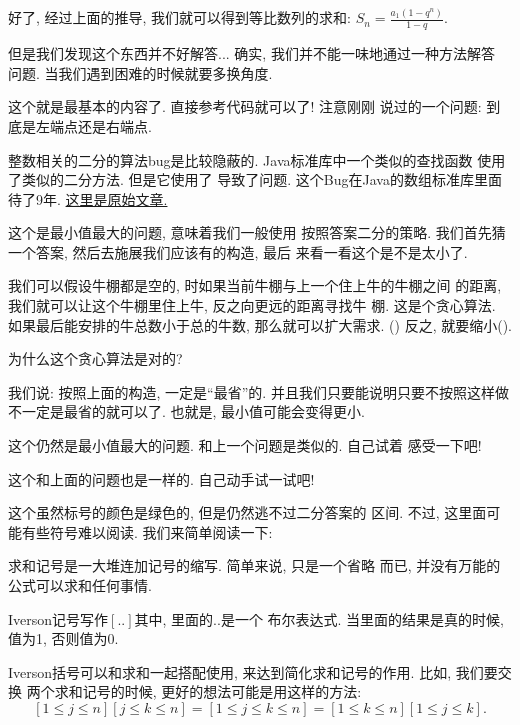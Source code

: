 好了, 经过上面的推导, 我们就可以得到等比数列的求和: $S_n=\frac{a_1(1-q^n)}{1-q}$.


但是我们发现这个东西并不好解答... 确实, 我们并不能一味地通过一种方法解答
问题. 当我们遇到困难的时候就要多换角度. 

 这个就是最基本的内容了. 直接参考代码就可以了! 注意刚刚
说过的一个问题: 到底是左端点还是右端点. 

\begin{remark}
    整数相关的二分的算法bug是比较隐蔽的. Java标准库中一个类似的查找函数
    使用了类似的二分方法. 但是它使用了
    导致了问题. 这个Bug在Java的数组标准库里面待了9年. 
    \href{https://dev.to/matheusgomes062/a-bug-was-found-in-java-after-almost-9-years-of-hiding-2d4k}{这里是原始文章.}
\end{remark}

 这个是最小值最大的问题, 意味着我们一般使用
按照答案二分的策略. 我们首先猜一个答案, 然后去施展我们应该有的构造, 最后
来看一看这个是不是太小了. 

我们可以假设牛棚都是空的, 时如果当前牛棚与上一个住上牛的牛棚之间
的距离, 我们就可以让这个牛棚里住上牛, 反之向更远的距离寻找牛
棚. 这是个贪心算法. 如果最后能安排的牛总数小于总的牛数, 那么就可以扩大需求. 
() 
反之, 就要缩小(). 

\begin{ques}
    为什么这个贪心算法是对的? 
\end{ques}

我们说: 按照上面的构造, 一定是``最省''的. 并且我们只要能说明只要不按照这样做
不一定是最省的就可以了. 也就是, 最小值可能会变得更小. 

  这个仍然是最小值最大的问题. 和上一个问题是类似的. 自己试着
感受一下吧!

 这个和上面的问题也是一样的. 自己动手试一试吧! 

 这个虽然标号的颜色是绿色的, 但是仍然逃不过二分答案的
区间. 不过, 这里面可能有些符号难以阅读. 我们来简单阅读一下: 

 求和记号是一大堆连加记号的缩写. 简单来说, 只是一个省略
而已, 并没有万能的公式可以求和任何事情. 

 Iverson记号写作$[..]$其中, 里面的$..$是一个
布尔表达式. 当里面的结果是真的时候, 值为1, 否则值为0. 

Iverson括号可以和求和一起搭配使用, 来达到简化求和记号的作用. 比如, 我们要交换
两个求和记号的时候, 更好的想法可能是用这样的方法: 
$$
[1\leq j\leq n][j\leq k \leq n]=[1\leq j \leq k \leq n] = 
[1\leq k\leq n][1\leq j\leq k]. 
$$

